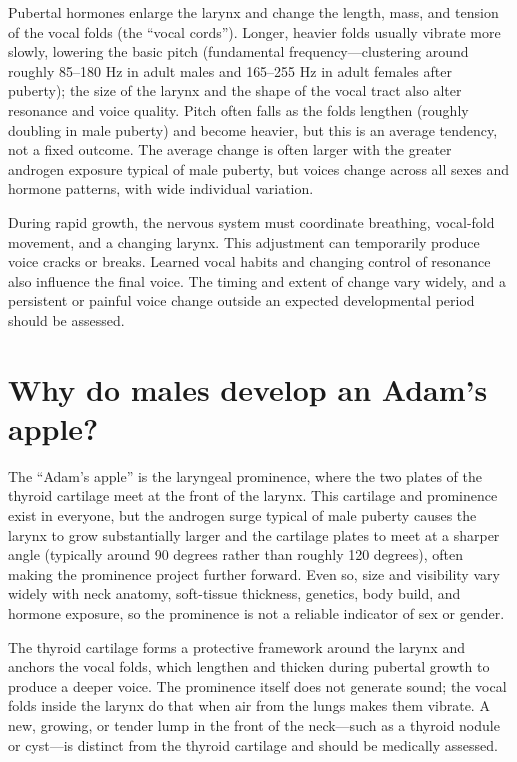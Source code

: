 \documentclass[11pt,oneside]{report}
\begin{document}
Pubertal hormones enlarge the larynx and change the length, mass, and tension
of the vocal folds (the ``vocal cords''). Longer, heavier folds usually vibrate
more slowly, lowering the basic pitch (fundamental frequency---clustering around
roughly 85--180 Hz in adult males and 165--255 Hz in adult females after
puberty); the size of the larynx and the shape of the vocal tract also alter
resonance and voice quality. Pitch often falls as the folds lengthen (roughly
doubling in male puberty) and become heavier, but this is an average tendency,
not a fixed outcome. The average change is often larger with the greater
androgen exposure typical of male puberty, but voices change across all sexes
and hormone patterns, with wide individual variation.

During rapid growth, the nervous system must coordinate breathing, vocal-fold
movement, and a changing larynx. This adjustment can temporarily produce voice
cracks or breaks. Learned vocal habits and changing control of resonance also
influence the final voice. The timing and extent of change vary widely, and a
persistent or painful voice change outside an expected developmental period
should be assessed.

\section{Why do males develop an Adam's apple?}

The ``Adam's apple'' is the laryngeal prominence, where the two plates of the
thyroid cartilage meet at the front of the larynx. This cartilage and
prominence exist in everyone, but the androgen surge typical of male puberty
causes the larynx to grow substantially larger and the cartilage plates to
meet at a sharper angle (typically around 90 degrees rather than roughly 120
degrees), often making the prominence project further forward. Even so, size and
visibility vary widely with neck anatomy, soft-tissue thickness, genetics, body
build, and hormone exposure, so the prominence is not a reliable indicator of
sex or gender.

The thyroid cartilage forms a protective framework around the larynx and
anchors the vocal folds, which lengthen and thicken during pubertal growth to
produce a deeper voice. The prominence itself does not generate sound; the
vocal folds inside the larynx do that when air from the lungs makes them
vibrate. A new, growing, or tender lump in the front of the neck---such as a
thyroid nodule or cyst---is distinct from the thyroid cartilage and should be
medically assessed.
\end{document}
